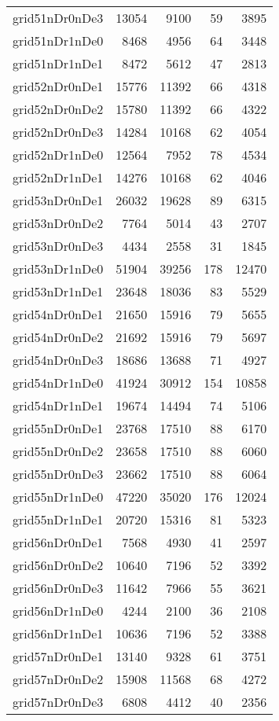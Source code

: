 \begin{tabular}{lrrrr}
grid51nDr0nDe3 & 13054 & 9100 & 59 & 3895 \\
grid51nDr1nDe0 & 8468 & 4956 & 64 & 3448 \\
grid51nDr1nDe1 & 8472 & 5612 & 47 & 2813 \\
grid52nDr0nDe1 & 15776 & 11392 & 66 & 4318 \\
grid52nDr0nDe2 & 15780 & 11392 & 66 & 4322 \\
grid52nDr0nDe3 & 14284 & 10168 & 62 & 4054 \\
grid52nDr1nDe0 & 12564 & 7952 & 78 & 4534 \\
grid52nDr1nDe1 & 14276 & 10168 & 62 & 4046 \\
grid53nDr0nDe1 & 26032 & 19628 & 89 & 6315 \\
grid53nDr0nDe2 & 7764 & 5014 & 43 & 2707 \\
grid53nDr0nDe3 & 4434 & 2558 & 31 & 1845 \\
grid53nDr1nDe0 & 51904 & 39256 & 178 & 12470 \\
grid53nDr1nDe1 & 23648 & 18036 & 83 & 5529 \\
grid54nDr0nDe1 & 21650 & 15916 & 79 & 5655 \\
grid54nDr0nDe2 & 21692 & 15916 & 79 & 5697 \\
grid54nDr0nDe3 & 18686 & 13688 & 71 & 4927 \\
grid54nDr1nDe0 & 41924 & 30912 & 154 & 10858 \\
grid54nDr1nDe1 & 19674 & 14494 & 74 & 5106 \\
grid55nDr0nDe1 & 23768 & 17510 & 88 & 6170 \\
grid55nDr0nDe2 & 23658 & 17510 & 88 & 6060 \\
grid55nDr0nDe3 & 23662 & 17510 & 88 & 6064 \\
grid55nDr1nDe0 & 47220 & 35020 & 176 & 12024 \\
grid55nDr1nDe1 & 20720 & 15316 & 81 & 5323 \\
grid56nDr0nDe1 & 7568 & 4930 & 41 & 2597 \\
grid56nDr0nDe2 & 10640 & 7196 & 52 & 3392 \\
grid56nDr0nDe3 & 11642 & 7966 & 55 & 3621 \\
grid56nDr1nDe0 & 4244 & 2100 & 36 & 2108 \\
grid56nDr1nDe1 & 10636 & 7196 & 52 & 3388 \\
grid57nDr0nDe1 & 13140 & 9328 & 61 & 3751 \\
grid57nDr0nDe2 & 15908 & 11568 & 68 & 4272 \\
grid57nDr0nDe3 & 6808 & 4412 & 40 & 2356 \\

\end{tabular}
